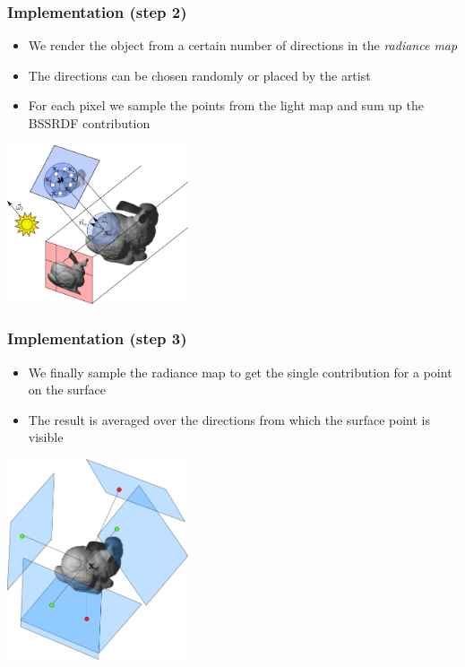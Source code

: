 \documentclass{beamer}
\begin{document}
\begin{frame}
    \frametitle{Implementation (step 2)}
			\begin{itemize}
			\item We render the object from a certain number of directions in the \emph{radiance map}
			\item The directions can be chosen randomly or placed by the artist
			\item For each pixel we sample the points from the light map and sum up the BSSRDF contribution
			\end{itemize}
			\centering
			\includegraphics[width=0.4\textwidth]{step2.jpg} 
\end{frame}

\begin{frame}
    \frametitle{Implementation (step 3)}
			\begin{itemize}
			\item We finally sample the radiance map to get the single contribution for a point on the surface
			\item The result is averaged over the directions from which the surface point is visible
			\end{itemize}
			\centering
			\vspace{-0.5cm}
			\includegraphics[width=0.4\textwidth]{step3.jpg} 
\end{frame}
\end{document}
